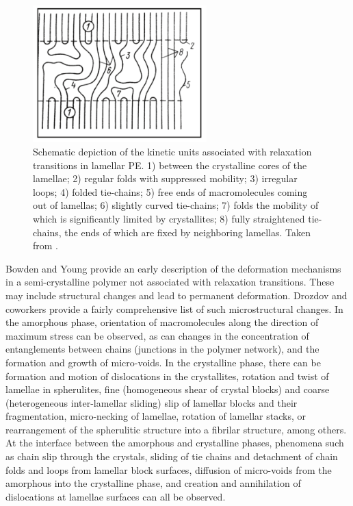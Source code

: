 \begin{figure}[hbtp]
    \centering
    \includegraphics[width=0.6\textwidth]{figures/kinetic_units_scp}
    \caption{Schematic depiction of the kinetic units associated with relaxation transitions in lamellar PE. 1) between the crystalline cores of the lamellae; 2) regular folds with suppressed mobility; 3) irregular loops; 4) folded tie-chains; 5) free ends of macromolecules coming out of lamellas; 6) slightly curved tie-chains; 7) folds the mobility of which is significantly limited by crystallites; 8) fully straightened tie-chains, the ends of which are fixed by neighboring lamellas. Taken from \cite{arzhakovRelaxationPhysicalMechanical2019}.}
\label{fig:kinetic_units_relax_scp}
\end{figure}

Bowden and Young \citep{bowdenDeformationMechanismsCrystalline1974} provide an early description of the deformation mechanisms in a semi-crystalline polymer not associated with relaxation transitions.
These may include structural changes and lead to permanent deformation.
Drozdov and coworkers \citep{drozdovViscoelasticityViscoplasticityCreep2009} provide a fairly comprehensive list of such microstructural changes.
In the amorphous phase, orientation of macromolecules along the direction of maximum stress can be observed, as can changes in the concentration of entanglements between chains (junctions in the polymer network), and the formation and growth of micro-voids.
In the crystalline phase, there can be formation and motion of dislocations in the crystallites, rotation and twist of lamellae in spherulites, fine (homogeneous shear of crystal blocks) and coarse (heterogeneous inter-lamellar sliding) slip of lamellar blocks and their fragmentation, micro-necking of lamellae, rotation of lamellar stacks, or rearrangement of the spherulitic structure into a fibrilar structure, among others.
At the interface between the amorphous and crystalline phases, phenomena such as chain slip through the crystals, sliding of tie chains and detachment of chain folds and loops from lamellar block surfaces, diffusion of micro-voids from the amorphous into the crystalline phase, and creation and annihilation of dislocations at lamellae surfaces can all be observed.

